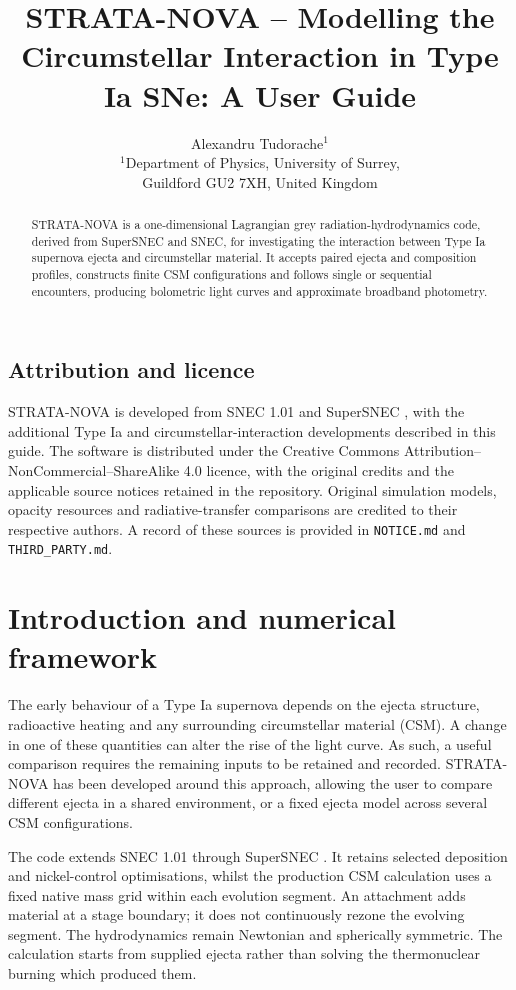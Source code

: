 \documentclass[11pt,a4paper]{article}
\title{\vspace{-1.3cm}\textbf{STRATA-NOVA -- Modelling the Circumstellar Interaction in Type Ia SNe: A User Guide}}
\author{Alexandru Tudorache$^{1}$\\[0.25em]
\small $^{1}$Department of Physics, University of Surrey,\\
\small Guildford GU2 7XH, United Kingdom}
\date{}
\newcommand{\code}[1]{\nolinkurl{#1}}
\begin{document}
\maketitle
\begin{abstract}
STRATA-NOVA is a one-dimensional Lagrangian grey radiation-hydrodynamics code, derived from SuperSNEC and SNEC, for investigating the interaction between Type Ia supernova ejecta and circumstellar material. It accepts paired ejecta and composition profiles, constructs finite CSM configurations and follows single or sequential encounters, producing bolometric light curves and approximate broadband photometry.
\end{abstract}

\subsection*{Attribution and licence}
STRATA-NOVA is developed from SNEC 1.01 \cite{morozova2015,snecmanual} and SuperSNEC \cite{supersnec2026}, with the additional Type Ia and circumstellar-interaction developments described in this guide. The software is distributed under the Creative Commons Attribution--NonCommercial--ShareAlike 4.0 licence, with the original credits and the applicable source notices retained in the repository. Original simulation models, opacity resources and radiative-transfer comparisons are credited to their respective authors. A record of these sources is provided in \code{NOTICE.md} and \code{THIRD_PARTY.md}.

{\small\tableofcontents}

\section{Introduction and numerical framework}
The early behaviour of a Type Ia supernova depends on the ejecta structure, radioactive heating and any surrounding circumstellar material (CSM). A change in one of these quantities can alter the rise of the light curve. As such, a useful comparison requires the remaining inputs to be retained and recorded. STRATA-NOVA has been developed around this approach, allowing the user to compare different ejecta in a shared environment, or a fixed ejecta model across several CSM configurations.

The code extends SNEC 1.01 \cite{morozova2015,snecmanual} through SuperSNEC \cite{supersnec2026}. It retains selected deposition and nickel-control optimisations, whilst the production CSM calculation uses a fixed native mass grid within each evolution segment. An attachment adds material at a stage boundary; it does not continuously rezone the evolving segment. The hydrodynamics remain Newtonian and spherically symmetric. The calculation starts from supplied ejecta rather than solving the thermonuclear burning which produced them.
\end{document}
